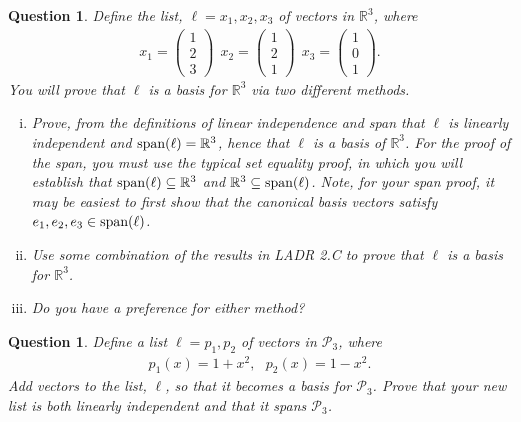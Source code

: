 \documentclass[12pt]{article}
\newtheorem{question}[thm]{Question}
\def\real{{\mathbb R}}
\def\SpanLA{\textnormal{span}}
\def\P{\mathcal P}
\newcommand{\ColVecThree}[3]{\begin{pmatrix} #1\\ #2\\ #3\end{pmatrix}}
\begin{document}
\begin{question}
	\normalfont
	
	Define the list, $\ell=x_1,x_2,x_3$ \hspace{.1cm} of vectors in $\real^3$, where 
	\begin{align*}
		x_1 = \ColVecThree{1}{2}{3}\ \ 
		x_2 = \ColVecThree{1}{2}{1}\ \
		x_3 = \ColVecThree{1}{0}{1}.
	\end{align*}
	You will prove that $\ell$ is a basis for $\real^3$ via two different methods.
	\begin{enumerate}[(i)]
		\item Prove, from the definitions of linear independence and span that $\ell$ is linearly independent and $\SpanLA(\ell)=\real^3$, hence that $\ell$ is a basis of $\real^3$.  For the proof of the span, you must use the typical set equality proof, in which you will establish that $\SpanLA(\ell)\subseteq \real^3$ and $\real^3\subseteq \SpanLA(\ell)$.  Note, for your span proof, it may be easiest to first show that the canonical basis vectors satisfy $e_1,e_2,e_3\in \SpanLA(\ell)$.
		
		\item Use some combination of the results in LADR 2.C to prove that $\ell$ is a basis for $\real^3$.
		
		\item Do you have a preference for either method?
		
	\end{enumerate}

\end{question}


\vspace{.3cm}








\begin{question}
	\normalfont
	
	
	Define a list $\ell = p_1, p_2$ \hspace{.1cm}of vectors in $\P_3$, where
	\begin{align*}
		p_1(x) = 1+x^2,\ \ \ 
		p_2(x) = 1-x^2.
	\end{align*}
	Add vectors to the list, $\ell$, so that it becomes a basis for $\P_3$.  Prove that your new list is both linearly independent and that it spans $\P_3$.
\end{question}


\vspace{.3cm}
\end{document}
